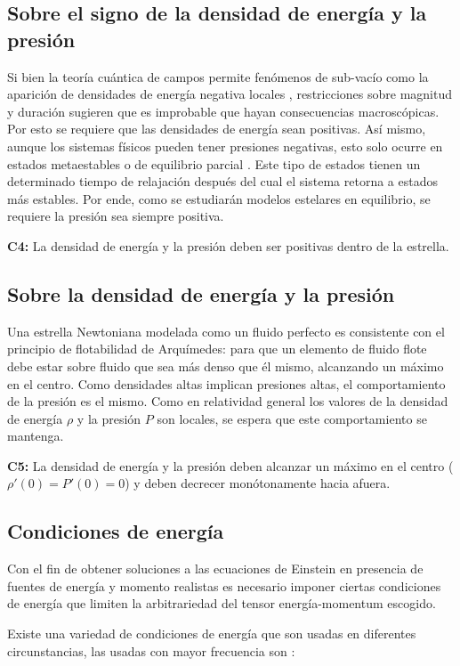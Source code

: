 \subsection*{Sobre el signo de la densidad de energía y la presión}
\noindent Si bien la teoría cuántica de campos permite fenómenos de sub-vacío como la aparición de densidades de energía negativa locales \cite{Ford2010}, restricciones sobre magnitud y duración sugieren que es improbable que hayan consecuencias macroscópicas. Por esto se requiere que las densidades de energía sean positivas.
Así mismo, aunque los sistemas físicos pueden tener presiones negativas, esto solo ocurre en estados metaestables o de equilibrio parcial \cite{Landau1980}. Este tipo de estados tienen un determinado tiempo de relajación después del cual el sistema retorna a estados más estables. Por ende, como se estudiarán modelos estelares en equilibrio, se requiere la presión sea siempre positiva. 

\textbf{C4:} La densidad de energía y la presión deben ser positivas dentro de la estrella. 

\subsection*{Sobre la densidad de energía y la presión}

\noindent Una estrella Newtoniana modelada como un fluido perfecto es consistente con el principio de flotabilidad de Arquímedes: para que un elemento de fluido flote debe estar sobre fluido que sea más denso que él mismo, alcanzando un máximo en el centro. Como densidades altas implican presiones altas, el comportamiento de la presión es el mismo. Como en relatividad general los valores de la densidad de energía $\rho$ y la presión $P$ son locales, se espera que este comportamiento se mantenga.

\textbf{C5:} La densidad de energía y la presión deben alcanzar un máximo en el centro ($\rho'(0)=P'(0)=0$) y deben decrecer monótonamente hacia afuera.

\subsection*{Condiciones de energía}
\noindent Con el fin de obtener soluciones a las ecuaciones de Einstein en presencia de fuentes de energía y momento realistas es necesario imponer ciertas condiciones de energía que limiten la arbitrariedad del tensor energía-momentum escogido.

Existe una variedad de condiciones de energía que son usadas en diferentes circunstancias, las usadas con mayor frecuencia son \cite{Hawking1973,Carroll2003}:


